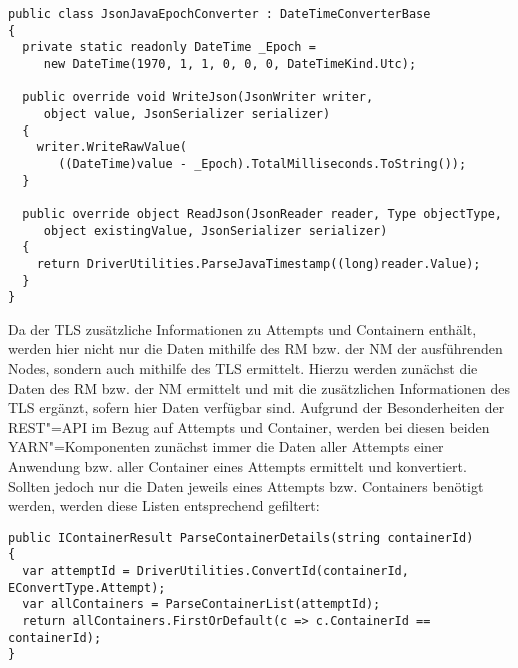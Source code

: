 \begin{lstlisting}[label=lst:javaEpochConverter,style=cs,
caption={[Entwickelter Konverter für Java"=Zeitstempel zur Nutzung mit Json.NET]
    Entwickelter Konverter für Java"=Zeitstempel zur Nutzung mit Json.NET.
    Dieser erbt dafür von \texttt{DateTimeConverterBase} des Json.NET"=Frameworks, damit der \texttt{JsonJavaEpochConverter} auch zur Konvertierung genutzt werden kann.}]
public class JsonJavaEpochConverter : DateTimeConverterBase
{
  private static readonly DateTime _Epoch =
     new DateTime(1970, 1, 1, 0, 0, 0, DateTimeKind.Utc);

  public override void WriteJson(JsonWriter writer,
     object value, JsonSerializer serializer)
  {
    writer.WriteRawValue(
       ((DateTime)value - _Epoch).TotalMilliseconds.ToString());
  }
  
  public override object ReadJson(JsonReader reader, Type objectType,
     object existingValue, JsonSerializer serializer)
  {
    return DriverUtilities.ParseJavaTimestamp((long)reader.Value);
  }
}
\end{lstlisting}

Da der \gls{TLS} zusätzliche Informationen zu Attempts und Containern enthält, werden hier nicht nur die Daten mithilfe des \gls{RM} bzw. der \gls{NM} der ausführenden Nodes, sondern auch mithilfe des \gls{TLS} ermittelt.
Hierzu werden zunächst die Daten des \gls{RM} bzw. der \gls{NM} ermittelt und mit die zusätzlichen Informationen des \gls{TLS} ergänzt, sofern hier Daten verfügbar sind.
Aufgrund der Besonderheiten der REST"=API im Bezug auf Attempts und Container, werden bei diesen beiden YARN"=Komponenten zunächst immer die Daten aller Attempts einer Anwendung bzw. aller Container eines Attempts ermittelt und konvertiert.
Sollten jedoch nur die Daten jeweils eines Attempts bzw. Containers benötigt werden, werden diese Listen entsprechend gefiltert:

\begin{lstlisting}[label=lst:restParseDetails,style=cs,
caption={[Konvertierung und Rückgabe eines Containers durch den RestParser]
    Konvertierung und Rückgabe eines Containers durch den \texttt{RestParser}.
    Hierbei muss für den hier gezeigten, einzelnen Container zunächst die ID des übergeordneten Attempts ermittelt werden, bevor aus der Liste aller Container die Daten des gesuchten Containers zurückgegeben werden können.
    Bei Attempts ist dieses Vorgehen analog.}]
public IContainerResult ParseContainerDetails(string containerId)
{
  var attemptId = DriverUtilities.ConvertId(containerId, EConvertType.Attempt);
  var allContainers = ParseContainerList(attemptId);
  return allContainers.FirstOrDefault(c => c.ContainerId == containerId);
}
\end{lstlisting}

